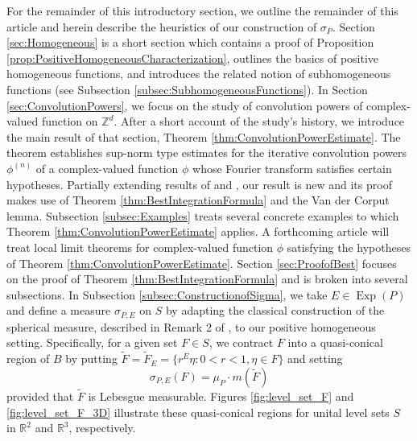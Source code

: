 \documentclass[11pt]{article}
\theoremstyle{remark}
\newcommand\Exp{\operatorname{Exp}}
\begin{document}
\noindent For the remainder of this introductory section, we outline the remainder of this article and herein describe the heuristics of our construction of $\sigma_P$. Section \ref{sec:Homogeneous} is a short section which contains a proof of Proposition \ref{prop:PositiveHomogeneousCharacterization}, outlines the basics of positive homogeneous functions, and introduces the related notion of subhomogeneous functions (see Subsection \ref{subsec:SubhomogeneousFunctions}). In Section \ref{sec:ConvolutionPowers}, we focus on the study of convolution powers of complex-valued function on $\mathbb{Z}^d$. After a short account of the study's history, we introduce the main result of that section, Theorem \ref{thm:ConvolutionPowerEstimate}. The theorem establishes sup-norm type estimates for the iterative convolution powers $\phi^{(n)}$ of a complex-valued function $\phi$ whose Fourier transform satisfies certain hypotheses. Partially extending results of \cite{randles_convolution_2015} and \cite{randles_convolution_2017}, our result is new and its proof makes use of Theorem \ref{thm:BestIntegrationFormula} and the Van der Corput lemma. Subsection \ref{subsec:Examples} treats several concrete examples to which Theorem \ref{thm:ConvolutionPowerEstimate} applies. A forthcoming article will treat local limit theorems for complex-valued function $\phi$ satisfying the hypotheses of Theorem \ref{thm:ConvolutionPowerEstimate}. Section \ref{sec:ProofofBest} focuses on the proof of Theorem \ref{thm:BestIntegrationFormula} and is broken into several subsections. In Subsection \ref{subsec:ConstructionofSigma}, we take $E\in\Exp(P)$ and define a measure $\sigma_{P,E}$ on $S$ by adapting the classical construction of the spherical measure, described in Remark 2 of \cite{folland_how_2001}, to our positive homogeneous setting. Specifically, for a given set $F\in S$, we contract $F$ into a quasi-conical region of $B$ by putting $\widetilde{F}=\widetilde{F}_E=\{r^E\eta:0<r<1,\eta\in F\}$
and setting
\begin{equation*}
\sigma_{P,E}(F)=\mu_P \cdot m(\widetilde{F})
\end{equation*}
provided that $\widetilde{F}$ is Lebesgue measurable. Figures \ref{fig:level_set_F} and \ref{fig:level_set_F_3D} illustrate these quasi-conical regions for unital level sets $S$ in $\mathbb{R}^2$ and $\mathbb{R}^3$, respectively.
\end{document}
